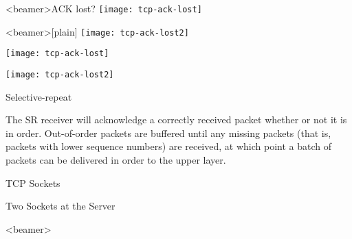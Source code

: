\begin{frame}<beamer>{ACK lost?}
  \centering
  \texttt{[image: tcp-ack-lost]}
\end{frame}

\begin{frame}<beamer>[plain]
  \centering
  \texttt{[image: tcp-ack-lost2]}
\end{frame}

\begin{minipage}{.42\linewidth}
  \texttt{[image: tcp-ack-lost]}  
\end{minipage}\hfill
\begin{minipage}{.56\linewidth}
  \texttt{[image: tcp-ack-lost2]}
\end{minipage}

\begin{frame}{Selective-repeat}
  \centering
  \mode<beamer>{ \texttt{[image: tcp-sr]} }%
\end{frame}

The SR receiver will acknowledge a correctly received packet whether or not it is in
order. Out-of-order packets are buffered until any missing packets (that is, packets with
lower sequence numbers) are received, at which point a batch of packets can be delivered
in order to the upper layer. 

\begin{frame}[plain]
  \begin{center}
  \end{center}
\end{frame}

\begin{frame}{TCP Sockets}
  \begin{iblock}{Two Sockets at the Server}
    \centering
  \end{iblock}
\end{frame}

\begin{frame}<beamer>%
  \centering
\end{frame}

